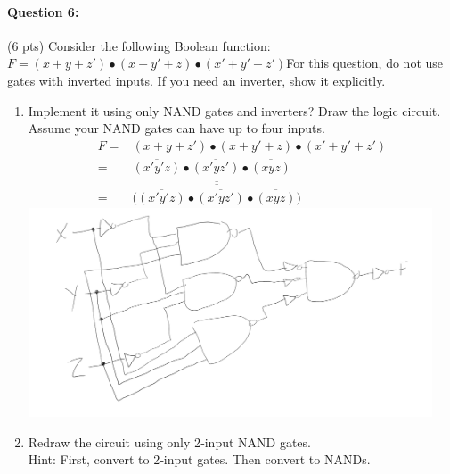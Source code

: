 \documentclass[12pt,letterpaper,titlepage]{report}
\begin{document}
\paragraph{Question 6: } (6 pts)  Consider the following Boolean function:  $F= (x + y + z′) \bullet (x + y′ + z)\bullet (x′ + y′ + z′) $For this question, do not use gates with inverted inputs. If you need an inverter, show it explicitly. 
\begin{enumerate}[noitemsep, label=\alph*)]
	\item Implement it using only NAND gates and inverters? Draw the logic circuit.  Assume your NAND gates can have 
up to four inputs.
	\begin{align*}
	F =& (x + y + z′) \bullet (x + y′ + z)\bullet (x′ + y′ + z′)
	\\=& \overline{(x'y'z)}\bullet\overline{(x'yz')}\bullet\overline{(xyz)}
	\\=& \overline{\overline{({\overline{\overline{(x'y'z)}} \bullet \overline{\overline{(x'yz')}}\bullet \overline{\overline{(xyz)}})}}}
	\end{align*}
	\includegraphics[width=12cm]{hw3p6a}
	\item Redraw the circuit using only 2‐input NAND gates. \\
	Hint: First, convert to 2‐input gates.  Then convert to NANDs.

\end{enumerate}
\pagebreak
\end{document}
